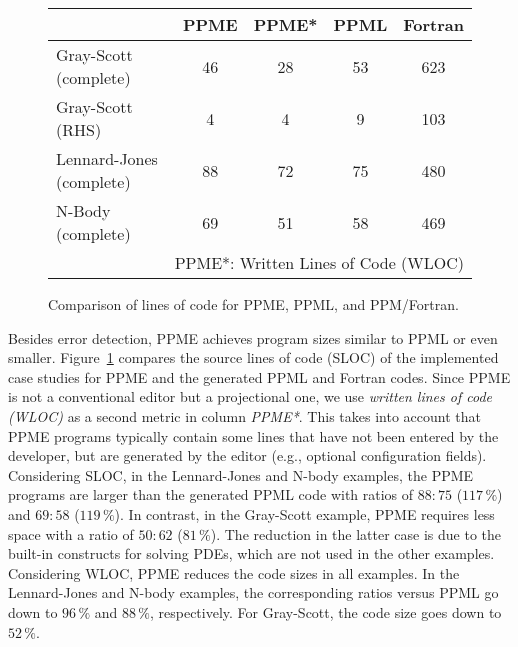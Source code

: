   \begin{figure}[tp]
    \centering
    \footnotesize
    \begin{tabular}{l c c c c}
      \toprule
        & PPME  & PPME*   & PPML  & Fortran   \\
      \midrule
      Gray-Scott (complete)
        & 46    & 28      & 53    & 623       \\
      Gray-Scott (RHS)
        & 4     &  4      & 9     & 103       \\
      \midrule
      Lennard-Jones (complete)
        & 88    & 72      & 75    & 480       \\
      \midrule
      N-Body (complete)
        & 69    & 51      & 58    & 469       \\
      \bottomrule
      \multicolumn{5}{r}{\scriptsize PPME*: Written Lines of Code (WLOC)}
    \end{tabular}
    \caption{Comparison of lines of code for PPME, PPML, and PPM/Fortran.}
    \label{fig:comparison-loc}
  \end{figure}
Besides error detection, PPME achieves program sizes similar to PPML or even smaller. Figure~\ref{fig:comparison-loc} compares the source lines of code (SLOC)
of the implemented case studies for PPME and the generated PPML and Fortran codes.
Since PPME is not a conventional editor but a projectional one, we use 
\emph{written lines of code (WLOC)} as a second metric in column \emph{PPME*}. 
This takes into account that PPME programs typically contain some lines that have not been 
entered by the developer, but are generated by the editor (e.g., optional configuration 
fields). 
%
Considering SLOC, in the Lennard-Jones and N-body examples, the PPME programs are
larger than the generated PPML code with ratios of $88:75$ ($117\,\%$) and $69:58$ ($119\,\%$).
In contrast, in the Gray-Scott example, PPME requires less space with a ratio of $50:62$ ($81\,\%$).
The reduction in the latter case is due to the built-in constructs for solving PDEs, which
are not used in the other examples.
%
Considering WLOC, PPME reduces the code sizes in all examples. In the 
Lennard-Jones and N-body examples, the corresponding ratios versus PPML go down to $96\,\%$ and 
$88\,\%$, respectively. For Gray-Scott, the code size goes down to $52\,\%$.

